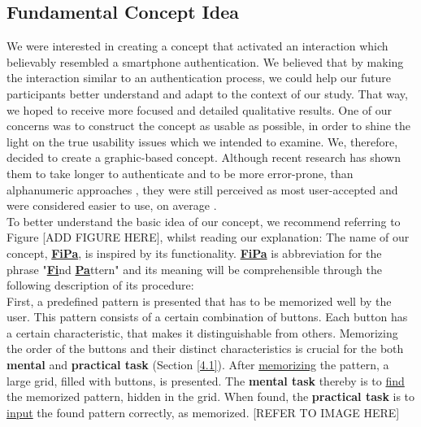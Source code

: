 \subsection{Fundamental Concept Idea} \label{4.2.1}
We were interested in creating a concept that activated an interaction which believably resembled a smartphone authentication. We believed that by making the interaction similar to an authentication process, we could help our future participants better understand and adapt to the context of our study. That way, we hoped to receive more focused and detailed qualitative results. One of our concerns was to construct the concept as usable as possible, in order to shine the light on the true usability issues which we intended to examine. We, therefore, decided to create a graphic-based concept. Although recent research has shown them to take longer to authenticate and to be more error-prone, than alphanumeric approaches \cite{AnatomySmartphone}, they were still perceived as most user-accepted and were considered easier to use, on average \cite{PatternWild}.\\

To better understand the basic idea of our concept, we recommend referring to Figure [ADD FIGURE HERE], whilst reading our explanation: 
The name of our concept, \underline{\textbf{FiPa}}, is inspired by its functionality. \underline{\textbf{FiPa}} is abbreviation for the phrase "\underline{\textbf{Fi}}nd \underline{\textbf{Pa}}ttern" and its meaning will be comprehensible through the following description of its procedure: \\
First, a predefined pattern is presented that has to be memorized well by the user. This pattern consists of a certain combination of buttons. Each button has a certain characteristic, that makes it distinguishable from others. Memorizing the order of the buttons and their distinct characteristics is crucial for the both \textbf{mental} and \textbf{practical task} (Section \ref{4.1}). After \underline{memorizing} the pattern, a large grid, filled with buttons, is presented. The \textbf{mental task} thereby is to \underline{find} the memorized pattern, hidden in the grid. When found, the \textbf{practical task} is to \underline{input} the found pattern correctly, as memorized. [REFER TO IMAGE HERE]\\

